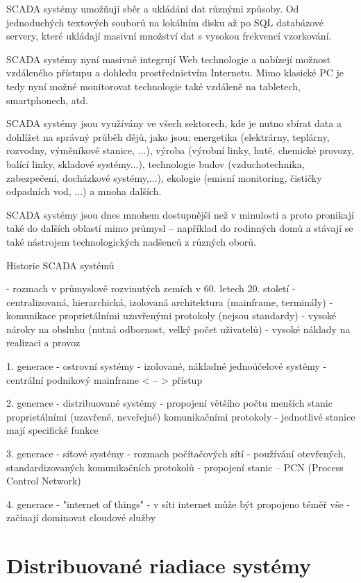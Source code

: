 \documentclass[]{tukediphc}
\begin{document}
SCADA systémy umožňují sběr a ukládání dat různými způsoby. Od jednoduchých textových souborů na lokálním disku až po SQL databázové servery, které ukládají masivní množství dat s vysokou frekvencí vzorkování.

SCADA systémy nyní masivně integrují Web technologie a nabízejí možnost vzdáleného přístupu a dohledu prostřednictvím Internetu. Mimo klasické PC je tedy nyní možné monitorovat technologie také vzdáleně na tabletech, smartphonech, atd.

SCADA systémy jsou využívány ve všech sektorech, kde je nutno sbírat data a dohlížet na správný průběh dějů, jako jsou: energetika (elektrárny, teplárny, rozvodny, výměníkové stanice, ...), výroba (výrobní linky, hutě, chemické provozy, balící linky, skladové systémy...), technologie budov (vzduchotechnika, zabezpečení, docházkové systémy,...), ekologie (emisní monitoring, čističky odpadních vod, ...) a mnoha dalších.

SCADA systémy jsou dnes mnohem dostupnější než v minulosti a proto pronikají také do dalších oblastí mimo průmysl – například do rodinných domů a stávají se také nástrojem technologických nadšenců z různých oborů.



Historie SCADA systémů

- rozmach v průmyslově rozvinutých zemích v 60. letech 20. století
- centralizovaná, hierarchická, izolovaná architektura (mainframe, terminály)
- komunikace proprietálními uzavřenými protokoly (nejsou standardy)
- vysoké nároky na obsluhu (nutná odbornost, velký počet uživatelů)
- vysoké náklady na realizaci a provoz

1. generace - ostrovní systémy
- izolované, nákladné jednoúčelové systémy
- centrální podnikový mainframe < – > přístup

2. generace - distribuované systémy
- propojení většího počtu menších stanic proprietálními (uzavřené, neveřejné) komunikačními protokoly
- jednotlivé stanice mají specifické funkce

3. generace - síťové systémy
- rozmach počítačových sítí
- používání otevřených, standardizovaných komunikačních protokolů
- propojení stanic – PCN (Process Control Network)

4. generace - "internet of things"
- v síti internet může být propojeno téměř vše
- začínají dominovat cloudové služby

\section{Distribuované riadiace systémy}
\end{document}

